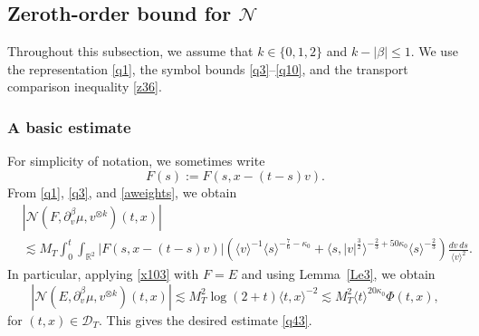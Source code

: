 \documentclass[reqno,11pt]{amsart}
\numberwithin{equation}{section}
\begin{document}
	
	
	
	\subsection{Zeroth-order bound for $\mathcal N$}\label{zerobound}
	
	Throughout this subsection, we assume that $k\in\{0,1,2\}$ and $k-|\beta|\le 1$. We use the
	representation \eqref{q1}, the symbol bounds \eqref{q3}--\eqref{q10}, and
	the transport comparison inequality \eqref{z36}.
	
	\subsubsection{A basic estimate}
	For simplicity of notation, we sometimes write
	\begin{equation*}
		F(s):=F(s,x-(t-s)v).
	\end{equation*}
	From \eqref{q1}, \eqref{q3}, and \eqref{aweights}, we obtain
	\begin{equation}\label{x103}
	\begin{split}
		&\left|\mathcal N(F,\partial_v^\beta\mu,v^{\otimes k})(t,x)\right|\\
		&\lesssim M_T
		\int_0^t\int_{\mathbb R^2}
		|F(s,x-(t-s)v)|	\left(\langle v\rangle^{-1}\langle s\rangle^{-\frac76-\kappa_0}+
		\langle s,|v|^{\frac32}\rangle^{-\frac23+50\kappa_0}
		\langle s\rangle^{-\frac23}\right)
		\frac{dv\,ds}{\langle v\rangle^{2}}.
	\end{split}
	\end{equation}
	In particular, applying \eqref{x103} with $F=E$ and using Lemma~\ref{Le3},
	we obtain
	\begin{equation}\label{q14}
		\left|\mathcal N(E,\partial_v^\beta\mu,v^{\otimes k})(t,x)\right|
		\lesssim
		M_T^2 \log(2+t)\langle t,x\rangle^{-2}\lesssim
		M_T^2\langle t\rangle^{20\kappa_0}\Phi(t,x),
	\end{equation}
	for $(t,x)\in\mathcal{D}_T$. This gives the desired estimate \eqref{q43}.
	
\end{document}
